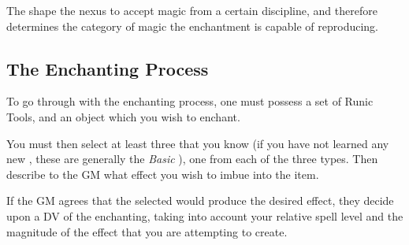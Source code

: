 {
	The  shape the nexus to accept magic from a certain discipline, and therefore determines the category of magic the enchantment is capable of reproducing.
}
{
	
	
	
	
	
	\esoRow{
} 



\def\learnText{
\subsection{Learning New \imp{runes}}

The \imp{runes} are divided up into 3 varying catergories, depending on how rare and powerful they are: {\it common}, {\it mystical} and {\it legendary}.

Anyone may use any of the \imp{runes}, if they can get their hands on a text from which to study it. This division merely serves to model how rare the corresponding knowledge is (and how expensive purchasing the relevant tome may be!)

Runes may be learned by finding an scroll, book or other representation of the rune, which the budding enchanter may then study for 30 minutes, before comitting it to memory. 



}



\subsection{The Enchanting Process}

To go through with the enchanting process, one must possess a set of Runic Tools, and an object which you wish to enchant. 

You must then select at least three  that you know (if you have not learned any new , these are generally the {\it Basic }), one from each of the three types. Then describe to the GM what effect you wish to imbue into the item. 

If the GM agrees that the selected  would produce the desired effect, they decide upon a DV of the enchanting, taking into account your relative spell level and the magnitude of the effect that you are attempting to create. 

}
